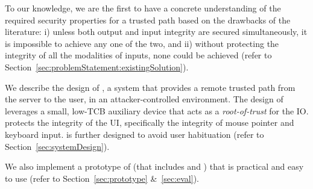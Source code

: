 \begin{mybullet}
  \item {} To our knowledge, we are the first to have a concrete understanding of the required security properties for a trusted path based on the drawbacks of the literature: i) unless both output and input integrity are secured simultaneously, it is impossible to achieve any one of the two, and ii) without protecting the integrity of all the modalities of inputs, none could be achieved (refer to Section~\ref{sec:problemStatement:existingSolution}).
  
   
  \item {} We describe the design of \name, a system that provides a remote trusted path from the server to the user, in an attacker-controlled environment. The design of \name leverages a small, low-TCB auxiliary device that acts as a \emph{root-of-trust} for the IO. \name protects the integrity of the UI, specifically the integrity of mouse pointer and keyboard input. \name is further designed to avoid user habituation (refer to Section~\ref{sec:systemDesign}).
  
  \item {}
  
   
  \item We also implement a prototype of \name (that includes \device and \name \js) that is practical and easy to use (refer to Section~\ref{sec:prototype} \&~\ref{sec:eval}).
\end{mybullet}



 
